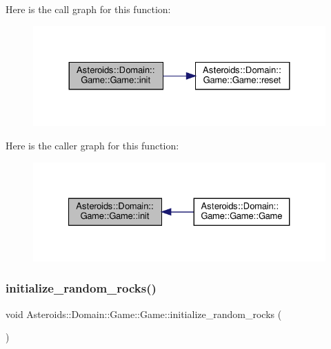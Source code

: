 Here is the call graph for this function\+:\nopagebreak
\begin{figure}[H]
\begin{center}
\leavevmode
\includegraphics[width=324pt]{classAsteroids_1_1Domain_1_1Game_1_1Game_a83299855cbf877f34f84b974fc35f8bb_cgraph}
\end{center}
\end{figure}
Here is the caller graph for this function\+:\nopagebreak
\begin{figure}[H]
\begin{center}
\leavevmode
\includegraphics[width=327pt]{classAsteroids_1_1Domain_1_1Game_1_1Game_a83299855cbf877f34f84b974fc35f8bb_icgraph}
\end{center}
\end{figure}
\mbox{\label{classAsteroids_1_1Domain_1_1Game_1_1Game_ad3a7040e8cc0b14228f46577ecf2bc78}} 
\subsubsection{\texorpdfstring{initialize\+\_\+random\+\_\+rocks()}{initialize\_random\_rocks()}}
{\footnotesize\ttfamily void Asteroids\+::\+Domain\+::\+Game\+::\+Game\+::initialize\+\_\+random\+\_\+rocks (\begin{DoxyParamCaption}{ }\end{DoxyParamCaption})\hspace{0.3cm}{\ttfamily [private]}}



